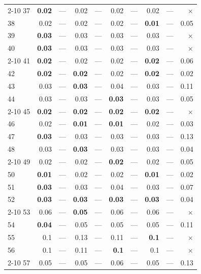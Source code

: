 \begin{longtable}{lr@{\hskip 4pt}l@{\hskip 12pt}r@{\hskip 4pt}l@{\hskip 12pt}r@{\hskip 4pt}l@{\hskip 12pt}r@{\hskip 4pt}l@{\hskip 12pt}r}
\cmidrule{2-10}
37 & \textbf{0.02} & --- & 0.02 & --- & 0.02 & --- & 0.02 & --- & $\times$ \\
38 & 0.02 & --- & 0.02 & --- & 0.02 & --- & \textbf{0.01} & --- & 0.05 \\
39 & \textbf{0.03} & --- & 0.03 & --- & 0.03 & --- & 0.03 & --- & $\times$ \\
40 & \textbf{0.03} & --- & 0.03 & --- & 0.03 & --- & 0.03 & --- & $\times$ \\
\cmidrule{2-10}
41 & \textbf{0.02} & --- & 0.02 & --- & 0.02 & --- & \textbf{0.02} & --- & 0.06 \\
42 & \textbf{0.02} & --- & \textbf{0.02} & --- & 0.02 & --- & \textbf{0.02} & --- & 0.02 \\
43 & 0.03 & --- & \textbf{0.03} & --- & 0.04 & --- & 0.03 & --- & 0.11 \\
44 & 0.03 & --- & 0.03 & --- & \textbf{0.03} & --- & 0.03 & --- & 0.05 \\
\cmidrule{2-10}
45 & \textbf{0.02} & --- & \textbf{0.02} & --- & \textbf{0.02} & --- & \textbf{0.02} & --- & $\times$ \\
46 & 0.02 & --- & \textbf{0.01} & --- & \textbf{0.01} & --- & 0.02 & --- & 0.03 \\
47 & \textbf{0.03} & --- & 0.03 & --- & 0.03 & --- & 0.03 & --- & 0.13 \\
48 & 0.03 & --- & \textbf{0.03} & --- & 0.03 & --- & 0.03 & --- & 0.04 \\
\cmidrule{2-10}
49 & 0.02 & --- & 0.02 & --- & \textbf{0.02} & --- & 0.02 & --- & 0.05 \\
50 & \textbf{0.01} & --- & 0.02 & --- & 0.02 & --- & \textbf{0.01} & --- & 0.02 \\
51 & \textbf{0.03} & --- & 0.03 & --- & 0.04 & --- & 0.03 & --- & 0.07 \\
52 & \textbf{0.03} & --- & \textbf{0.03} & --- & \textbf{0.03} & --- & \textbf{0.03} & --- & 0.04 \\
\cmidrule{2-10}
53 & 0.06 & --- & \textbf{0.05} & --- & 0.06 & --- & 0.06 & --- & $\times$ \\
54 & \textbf{0.04} & --- & 0.05 & --- & 0.05 & --- & 0.05 & --- & 0.11 \\
55 & 0.1 & --- & 0.13 & --- & 0.11 & --- & \textbf{0.1} & --- & $\times$ \\
56 & 0.1 & --- & 0.11 & --- & \textbf{0.1} & --- & 0.1 & --- & $\times$ \\
\cmidrule{2-10}
57 & 0.05 & --- & 0.05 & --- & 0.06 & --- & 0.05 & --- & 0.13 \\

\end{longtable}
